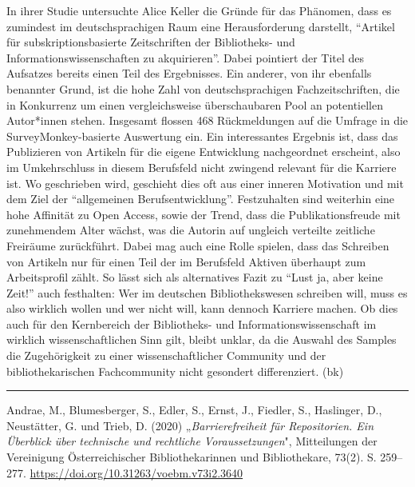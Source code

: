 \documentclass[a4paper,
fontsize=11pt,
oneside,
numbers=noperiodatend,
parskip=half-,
bibliography=totoc,
final
]{scrartcl}
\begin{document}
In ihrer Studie untersuchte Alice Keller die Gründe für das Phänomen,
dass es zumindest im deutschsprachigen Raum eine Herausforderung
darstellt, \enquote{Artikel für subskriptionsbasierte Zeitschriften der
Bibliotheks- und Informationswissenschaften zu akquirieren}. Dabei
pointiert der Titel des Aufsatzes bereits einen Teil des Ergebnisses.
Ein anderer, von ihr ebenfalls benannter Grund, ist die hohe Zahl von
deutschsprachigen Fachzeitschriften, die in Konkurrenz um einen
vergleichsweise überschaubaren Pool an potentiellen Autor*innen stehen.
Insgesamt flossen 468 Rückmeldungen auf die Umfrage in die
SurveyMonkey-basierte Auswertung ein. Ein interessantes Ergebnis ist,
dass das Publizieren von Artikeln für die eigene Entwicklung
nachgeordnet erscheint, also im Umkehrschluss in diesem Berufsfeld nicht
zwingend relevant für die Karriere ist. Wo geschrieben wird, geschieht
dies oft aus einer inneren Motivation und mit dem Ziel der
\enquote{allgemeinen Berufsentwicklung}. Festzuhalten sind weiterhin
eine hohe Affinität zu Open Access, sowie der Trend, dass die
Publikationsfreude mit zunehmendem Alter wächst, was die Autorin auf
ungleich verteilte zeitliche Freiräume zurückführt. Dabei mag auch eine
Rolle spielen, dass das Schreiben von Artikeln nur für einen Teil der im
Berufsfeld Aktiven überhaupt zum Arbeitsprofil zählt. So lässt sich als
alternatives Fazit zu \enquote{Lust ja, aber keine Zeit!} auch
festhalten: Wer im deutschen Bibliothekswesen schreiben will, muss es
also wirklich wollen und wer nicht will, kann dennoch Karriere machen.
Ob dies auch für den Kernbereich der Bibliotheks- und
Informationswissenschaft im wirklich wissenschaftlichen Sinn gilt,
bleibt unklar, da die Auswahl des Samples die Zugehörigkeit zu einer
wissenschaftlicher Community und der bibliothekarischen Fachcommunity
nicht gesondert differenziert. (bk)

\begin{center}\rule{0.5\linewidth}{0.5pt}\end{center}

Andrae, M., Blumesberger, S., Edler, S., Ernst, J., Fiedler, S.,
Haslinger, D., Neustätter, G. und Trieb, D. (2020)
„\emph{Barrierefreiheit für Repositorien. Ein Überblick über technische
und rechtliche Voraussetzungen}", Mitteilungen der Vereinigung
Österreichischer Bibliothekarinnen und Bibliothekare, 73(2). S.
259--277. \url{https://doi.org/10.31263/voebm.v73i2.3640}
\end{document}
